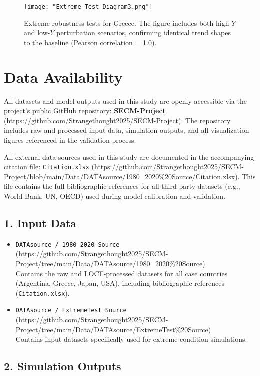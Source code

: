 \documentclass[12pt,a4paper]{article}
\begin{document}
\begin{figure}[h]
    \centering
    \texttt{[image: "Extreme Test Diagram3.png"]}
    \caption{Extreme robustness tests for Greece. The figure includes both high-$Y$ and low-$Y$ perturbation scenarios, confirming identical trend shapes to the baseline (Pearson correlation = 1.0).}
    \label{fig:greece_extreme}
\end{figure}

\section*{Data Availability}
All datasets and model outputs used in this study are openly accessible via the project’s public GitHub repository: \textbf{SECM-Project} (\url{https://github.com/Strangethought2025/SECM-Project}). The repository includes raw and processed input data, simulation outputs, and all visualization figures referenced in the validation process.

All external data sources used in this study are documented in the accompanying citation file: \texttt{Citation.xlsx} (\url{https://github.com/Strangethought2025/SECM-Project/blob/main/Data/DATAsource/1980_2020\%20Source/Citation.xlsx}). This file contains the full bibliographic references for all third-party datasets (e.g., World Bank, UN, OECD) used during model calibration and validation.

\subsection*{1. Input Data}
\begin{itemize}
    \item \texttt{DATAsource / 1980\_2020 Source} (\url{https://github.com/Strangethought2025/SECM-Project/tree/main/Data/DATAsource/1980_2020\%20Source})\\
    Contains the raw and LOCF-processed datasets for all case countries (Argentina, Greece, Japan, USA), including bibliographic references (\texttt{Citation.xlsx}).
    \item \texttt{DATAsource / ExtremeTest Source} (\url{https://github.com/Strangethought2025/SECM-Project/tree/main/Data/DATAsource/ExtremeTest\%20Source})\\
    Contains input datasets specifically used for extreme condition simulations.
\end{itemize}

\subsection*{2. Simulation Outputs}
\end{document}
